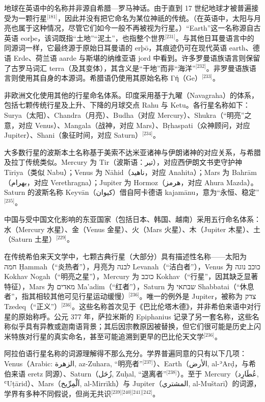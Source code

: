 地球在英语中的名称并非源自希腊—罗马神话。由于直到 17 世纪地球才被普遍接受为一颗行星\(^\text{[181]}\)，因此并没有把它命名为某位神祇的传统。（在英语中，太阳与月亮也属于这种情况，尽管它们如今一般不再被视为行星。）“Earth”这一名称源自古英语 eorþe，该词既指“土地”“泥土”，也指整个世界\(^\text{[231]}\)。与其他日耳曼语言中的同源词一样，它最终源于原始日耳曼语的 erþō，其痕迹仍可在现代英语 earth、德语 Erde、荷兰语 aarde 与斯堪的纳维亚语 jord 中看到。许多罗曼语族语言则保留了古罗马词汇 terra（及其变体），其含义是“干地”而非“海洋”\(^\text{[232]}\)。非罗曼语族语言则使用其自身的本源词。希腊语仍使用其原始名称 Γή（Ge）\(^\text{[233]}\)。

非欧洲文化使用其他的行星命名体系。印度采用基于九曜（Navagraha）的体系，包括七颗传统行星及上升、下降的月球交点 Rahu 与 Ketu。各行星名称如下：Surya（太阳）、Chandra（月亮）、Budha（对应 Mercury）、Shukra（“明亮”之意，对应 Venus）、Mangala（战神，对应 Mars）、Bṛhaspati（众神顾问，对应 Jupiter）、Shani（象征时间，对应 Saturn）\(^\text{[234]}\)。

大多数行星的波斯本土名称基于美索不达米亚诸神与伊朗诸神的对应关系，与希腊及拉丁传统类似。Mercury 为 Tir（波斯语：تیر），对应西伊朗文书吏守护神 Tīriya（类似 Nabu）；Venus 为 Nāhid（ناهید，对应 Anahita）；Mars 为 Bahrām（بهرام，对应 Verethragna）；Jupiter 为 Hormoz（هرمز，对应 Ahura Mazda）。Saturn 的波斯名称 Keyvān（کیوان）借自阿卡德语 kajamānu，意为“永恒、稳定”\(^\text{[235]}\)。

中国与受中国文化影响的东亚国家（包括日本、韩国、越南）采用五行命名体系：水（Mercury 水星）、金（Venus 金星）、火（Mars 火星）、木（Jupiter 木星）、土（Saturn 土星）\(^\text{[229]}\)。

在传统希伯来天文学中，七颗古典行星（大部分）具有描述性名称——太阳为 חמה Ḥammah（“炎热者”），月亮为 לבנה Levanah（“洁白者”），Venus 为 כוכב נוגה Kokhav Nogah（“明亮之星”），Mercury 为 כוכב Kokhav（“行星”，因其缺乏显著特征），Mars 为 מאדים Ma'adim（“红者”），Saturn 为 שבתאי Shabbatai（“休息者”，指其相较其他可见行星运动缓慢）\(^\text{[236]}\)。唯一的例外是 Jupiter，被称为 צדק Tzedeq（“正义”）\(^\text{[236]}\)。这些名称首次见于《巴比伦塔木德》，并非希伯来语中对行星的原始称呼。公元 377 年，萨拉米斯的 Epiphanius 记录了另一套名称，这些名称似乎具有异教或迦南语背景；其后因宗教原因被替换，但它们很可能是历史上闪米特族对行星的真实命名，甚至可能追溯到更早的巴比伦天文学\(^\text{[236]}\)。

阿拉伯语行星名称的词源理解得不那么充分。学界普遍同意的只有以下几项：Venus（Arabic: الزهرة, az-Zuhara, “明亮者”\(^\text{[237]}\)）、Earth（الأرض, al-ʾArḍ，与希伯来语 eretz 同源）、Saturn（زُحَل, Zuḥal, “退离者”\(^\text{[238]}\)）。至于 Mercury（عُطَارِد, ʿUṭārid）、Mars（اَلْمِرِّيخ, al-Mirrīkh）与 Jupiter（المشتري, al-Muštarī）的词源，学界有多种不同假说，但尚无共识\(^\text{[239][240][241][242]}\)。

